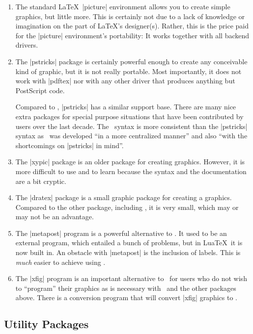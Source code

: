 \begin{enumerate}
    \item The standard \LaTeX\ |{picture}| environment allows you to create
        simple graphics, but little more. This is certainly not due to a lack
        of knowledge or imagination on the part of \LaTeX's designer(s).
        Rather, this is the price paid for the |{picture}| environment's
        portability: It works together with all backend drivers.
    \item The |pstricks| package is certainly powerful enough to create any
        conceivable kind of graphic, but it is not really portable. Most
        importantly, it does not work with |pdftex| nor with any other driver
        that produces anything but PostScript code.

        Compared to \tikzname, |pstricks| has a similar support base. There
        are many nice extra packages for special purpose situations that have
        been contributed by users over the last decade. The \tikzname\ syntax
        is more consistent than the |pstricks| syntax as \tikzname\ was
        developed ``in a more centralized manner'' and also ``with the
        shortcomings on |pstricks| in mind''.
    \item The |xypic| package is an older package for creating graphics.
        However, it is more difficult to use and to learn because the syntax
        and the documentation are a bit cryptic.
    \item The |dratex| package is a small graphic package for creating a
        graphics. Compared to the other package, including \tikzname, it is
        very small, which may or may not be an advantage.
    \item The |metapost| program is a powerful alternative to \tikzname. It
        used to be an external program, which entailed a bunch of problems,
        but in Lua\TeX\ it is now built in. An obstacle with |metapost| is
        the inclusion of labels. This is \emph{much} easier to achieve using
        \pgfname.
    \item The |xfig| program is an important alternative to \tikzname\ for
        users who do not wish to ``program'' their graphics as is necessary
        with \tikzname\ and the other packages above. There is a conversion
        program that will convert |xfig| graphics to \tikzname.
\end{enumerate}


\subsection{Utility Packages}

